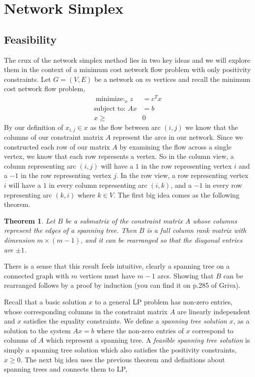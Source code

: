 \documentclass[12pt]{amsart}
\newtheorem{theorem}{Theorem}
\begin{document}
\section{Network Simplex}
\subsection{Feasibility}
The crux of the network simplex method lies in two key ideas and we will explore them in the context of a 
minimum cost network flow problem with only positivity constraints. Let $G = (V, E)$ be a network on $m$ vertices and recall the minimum cost network flow problem, 
\begin{align*}
    \mathop{\text{minimize: }}_{x}  z &= c^Tx\\
  \text{subject to: }Ax &= b\\
  x \geq& 0
\end{align*}
By our definition of $x_{i, j} \in x$ as the flow between arc $(i, j)$ we know that the columns of our constraint matrix $A$ represent 
the arcs in our network. Since we constructed each row of our matrix $A$ by examining the flow across a single vertex, we know that each row represents a vertex. So in the column view, a column representing arc $(i, j)$ will have a $1$ in the row representing vertex $i$ and a $-1$ in the row representing 
vertex $j$. In the row view, a row representing vertex $i$ will have a $1$ in every column representing arc $(i, k)$, and a $-1$ in every row representing arc $(k, i)$ where 
$k \in V$. The first big idea comes as the following theorem.
\begin{theorem} Let $B$ be a submatrix of the constraint matrix $A$ whose columns represent the edges of a spanning tree.
    Then $B$ is a full column rank matrix with dimension $m \times (m - 1)$, and it can be rearranged so that the diagonal entries are $\pm 1$. 
\end{theorem}

There is a sense that this result feels intuitive, clearly a spanning tree on a connected graph with $m$ vertices must have $m - 1$ arcs. Showing that 
$B$ can be rearranged follows by a proof by induction (you can find it on p.285 of Griva). 


Recall that a basic solution $x$ to a general LP problem has non-zero entries, whose corresponding columns in the constraint matrix $A$ are linearly independent
and $x$ satisfies the equality constraints. We define a \emph{spanning tree solution} $x$, as a solution to the system $Ax = b$ where the non-zero entries of $x$
correspond to columns of $A$ which represent a spanning tree. A \emph{feasible spanning tree solution} is simply a spanning tree solution which also satisfies the 
positivity constraints, $x \geq 0$. The next big idea uses the previous theorem and definitions about spanning trees and connects them to LP, 
  
\end{document}
